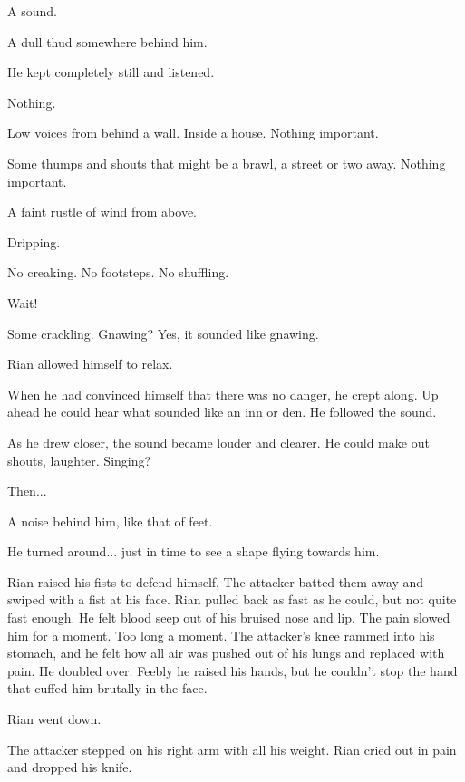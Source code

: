 
A sound. 

A dull thud somewhere behind him. 


He kept completely still and listened. 

Nothing.

Low voices from behind a wall. 
Inside a house. 
Nothing important. 

Some thumps and shouts that might be a brawl, a street or two away. 
Nothing important. 

A faint rustle of wind from above. 

Dripping. 

No creaking. 
No footsteps. 
No shuffling. 

Wait! 

Some crackling. 
Gnawing? 
Yes, it sounded like gnawing. 

Rian allowed himself to relax. 

When he had convinced himself that there was no danger, he crept along. 
Up ahead he could hear what sounded like an inn or den. 
He followed the sound. 

As he drew closer, the sound became louder and clearer. 
He could make out shouts, laughter. 
Singing? 

Then...


A noise behind him, like that of feet. 

He turned around... just in time to see a \human{} shape flying towards him. 

Rian raised his fists to defend himself. 
The attacker batted them away and swiped with a fist at his face.
Rian pulled back as fast as he could, but not quite fast enough. 
He felt blood seep out of his bruised nose and lip. 
The pain slowed him for a moment. 
Too long a moment. 
The attacker's knee rammed into his stomach, and he felt how all air was pushed out of his lungs and replaced with pain. 
He doubled over. 
Feebly he raised his hands, but he couldn't stop the hand that cuffed him brutally in the face. 

Rian went down. 

The attacker stepped on his right arm with all his weight. 
Rian cried out in pain and dropped his knife. 

